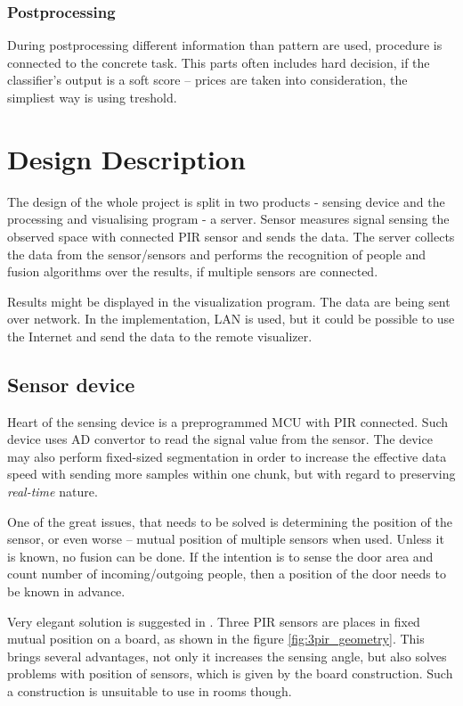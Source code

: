 \subsection*{Postprocessing}
During postprocessing different information than pattern are used, procedure is
connected to the concrete task. This parts often includes hard decision, if the
classifier's output is a soft score -- prices are taken into consideration,
the simpliest way is using treshold.




\chapter{Design Description}

The design of the whole project is split in two products - sensing device
and the processing and visualising program - a server. Sensor measures signal
sensing the observed space with connected PIR sensor and sends the data. The server
collects the data from the sensor/sensors and performs the recognition of 
people and fusion algorithms over the results, if multiple sensors are connected.

Results might be displayed in the visualization program. The data are being sent
over network. In the implementation, LAN is used, but it could be possible to
use the Internet and send the data to the remote visualizer.


\section{Sensor device}

Heart of the sensing device is a preprogrammed MCU with PIR connected. Such device
uses AD convertor to read the signal value from the sensor. The device may also
perform fixed-sized segmentation in order to increase the effective data speed with
sending more samples within one chunk, but with regard to preserving {\it real-time}
nature.

One of the great issues, that needs to be solved is determining the position of the sensor,
or even worse -- mutual position of multiple sensors when used. Unless it is
known, no fusion can be done. If the intention is to sense the door area and count
number of incoming/outgoing people, then a position of the door needs to be known
in advance.

Very elegant solution is suggested in \cite{GestureControl}. Three PIR sensors are
places in fixed mutual position on a board, as shown in the figure \ref{fig:3pir_geometry}.
This brings several advantages, not only it increases the sensing angle,
but also solves problems with position of sensors, which is given by the board construction.
Such a construction is unsuitable to use in rooms though.

